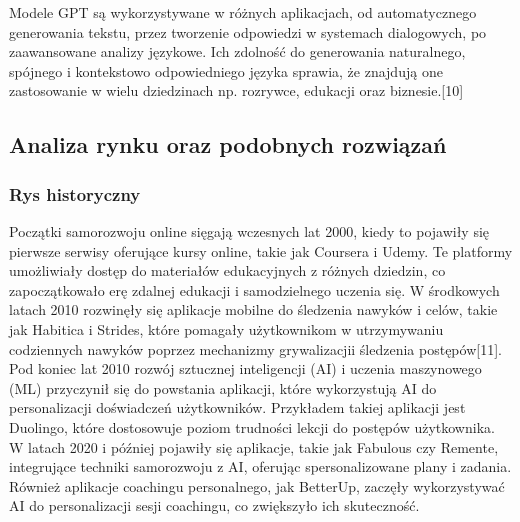 \begin{enumerate}
    Modele GPT są wykorzystywane w różnych aplikacjach, od automatycznego generowania tekstu, przez tworzenie odpowiedzi w systemach dialogowych, po zaawansowane analizy językowe. Ich zdolność do generowania naturalnego, spójnego i kontekstowo odpowiedniego języka sprawia, że znajdują one zastosowanie w wielu dziedzinach np. rozrywce, edukacji oraz biznesie.[10]
    \\
     
 \end{enumerate}
\subsection{Analiza rynku oraz podobnych rozwiązań}

\subsubsection{Rys historyczny}
Początki samorozwoju online sięgają wczesnych lat 2000, kiedy to pojawiły się pierwsze serwisy oferujące kursy online, takie jak Coursera i Udemy. Te platformy umożliwiały dostęp do materiałów edukacyjnych z różnych dziedzin, co zapoczątkowało erę zdalnej edukacji i samodzielnego uczenia się. W środkowych latach 2010 rozwinęły się aplikacje mobilne do śledzenia nawyków i celów, takie jak Habitica i Strides, które pomagały użytkownikom w utrzymywaniu codziennych nawyków poprzez mechanizmy grywalizacji\linebreak i śledzenia postępów[11].
Pod koniec lat 2010 rozwój sztucznej inteligencji (AI) i uczenia maszynowego (ML) przyczynił się do powstania aplikacji, które wykorzystują AI do personalizacji doświadczeń użytkowników. Przykładem takiej aplikacji jest Duolingo, które dostosowuje poziom trudności lekcji do postępów użytkownika. W latach 2020 i później pojawiły się aplikacje, takie jak Fabulous czy Remente, integrujące techniki samorozwoju z AI, oferując spersonalizowane plany i zadania. Również aplikacje coachingu personalnego, jak BetterUp, zaczęły wykorzystywać AI do personalizacji sesji coachingu, co zwiększyło ich skuteczność.

